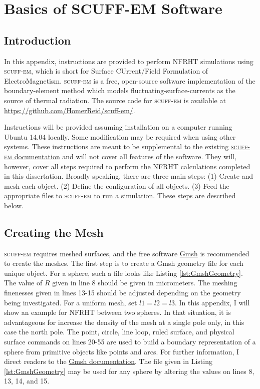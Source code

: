 \chapter[Basics of SCUFF-EM Software][Basics of SCUFF-EM Software]{Basics of SCUFF-EM Software} \label{ap:SCUFFEM}

\section{Introduction}
%
In this appendix, instructions are provided to perform NFRHT simulations using \textsc{scuff-em}, which is short for Surface CUrrent/Field Formulation of ElectroMagnetism. \textsc{scuff-em} is a free, open-source software implementation of the boundary-element method \cite{scuffem, Reid2015} which models fluctuating-surface-currents as the source of thermal radiation. The source code for \textsc{scuff-em} is available at \url{https://github.com/HomerReid/scuff-em/}.

Instructions will be provided assuming installation on a computer running Ubuntu 14.04 locally. Some modification may be required when using other systems. These instructions are meant to be supplemental to the existing \href{http://homerreid.github.io/scuff-em-documentation/}{\textsc{scuff-em} documentation} and will not cover all features of the software. They will, however, cover all steps required to perform the NFRHT calculations completed in this dissertation. Broadly speaking, there are three main steps: (1) Create and mesh each object. (2) Define the configuration of all objects. (3) Feed the appropriate files to \textsc{scuff-em} to run a simulation. These steps are described below.


\section{Creating the Mesh}
%
\textsc{scuff-em} requires meshed surfaces, and the free software \href{http://gmsh.info/}{Gmsh} is recommended to create the meshes. The first step is to create a Gmsh geometry file for each unique object. For a sphere, such a file looks like Listing \ref{lst:GmshGeometry}. The value of $R$ given in line 8 should be given in micrometers. The meshing finenesses given in lines 13-15 should be adjusted depending on the geometry being investigated. For a uniform mesh, set $l1=l2=l3$. In this appendix, I will show an example for NFRHT between two spheres. In that situation, it is advantageous for increase the density of the mesh at a single pole only, in this case the north pole. The point, circle, line loop, ruled surface, and physical surface commands on lines 20-55 are used to build a boundary representation of a sphere from primitive objects like points and arcs. For further information, I direct readers to the \href{http://gmsh.info/doc/texinfo/gmsh.html}{Gmsh documentation}. The file given in Listing \ref{lst:GmshGeometry} may be used for any sphere by altering the values on lines 8, 13, 14, and 15.

